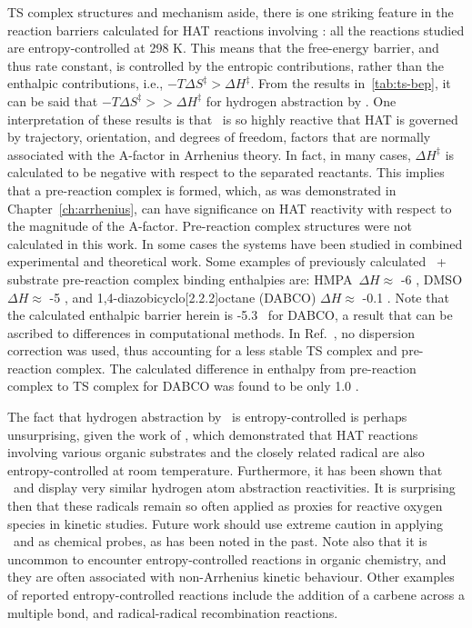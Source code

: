 \begin{doublespace}
TS complex structures and mechanism aside, there is one striking feature in the
reaction barriers calculated for HAT reactions involving \cumo: all the
reactions studied are entropy-controlled at 298 K. This means that the
free-energy barrier, and thus rate constant, is controlled by the entropic
contributions, rather than the enthalpic contributions, i.e., $-T\Delta
S^\ddagger > \Delta H^\ddagger$. From the results in~\ref{tab:ts-bep}, it can
be said that $-T\Delta S^\ddagger >> \Delta H^\ddagger$ for hydrogen
abstraction by \cumo. One interpretation of these results is that \cumo\ is so
highly reactive that HAT is governed by trajectory, orientation, and degrees of
freedom, factors that are normally associated with the A-factor in Arrhenius
theory. In fact, in many cases, $\Delta H^\ddagger$ is calculated to be
negative with respect to the separated reactants. This implies that a
pre-reaction complex is formed, which, as was demonstrated in
Chapter~\ref{ch:arrhenius}, can have significance on HAT reactivity with
respect to the magnitude of the A-factor. Pre-reaction complex structures were
not calculated in this work. In some cases the systems have been
studied in combined experimental and theoretical work. Some examples of
previously calculated \cumo\ + substrate pre-reaction complex binding
enthalpies are: HMPA\footnotemark\ $\Delta H \approx$ -6 \kcalmol, DMSO $\Delta
H \approx$ -5 \kcalmol, and 1,4-diazobicyclo[2.2.2]octane
(DABCO)\cite{Salamone2011b} $\Delta H \approx$ -0.1 \kcalmol. Note that the
calculated enthalpic barrier herein is -5.3 \kcalmol\ for DABCO, a result that
can be ascribed to differences in computational methods. In
Ref.~, no dispersion correction was used, thus
accounting for a less stable TS complex and pre-reaction complex. The
calculated difference in enthalpy from pre-reaction complex to TS complex for
DABCO was found to be only 1.0 \kcalmol.


The fact that hydrogen abstraction by \cumo\ is entropy-controlled is perhaps
unsurprising, given the work of \citet{Finn2004}, which demonstrated that HAT
reactions involving various organic substrates and the closely related radical
 are also entropy-controlled at room temperature. Furthermore, it
has been shown that \cumo\ and  display very similar hydrogen atom
abstraction reactivities.\cite{Salamone2011, Valgimigli1995, Sheeller2001,
Baignee1983} It is surprising then that these radicals remain so often applied
as proxies for reactive oxygen species in kinetic studies. Future work should
use extreme caution in applying \cumo\ and  as chemical probes, as
has been noted in the past.\cite{Finn2004, Salamone2011b, Salamone2011} Note
also that it is uncommon to encounter entropy-controlled reactions in organic
chemistry, and they are often associated with non-Arrhenius kinetic behaviour.
Other examples of reported entropy-controlled reactions include the addition of
a carbene across a multiple bond,\cite{Houk1984, Moss2017} and radical-radical
recombination reactions.\cite{Sobek2001}


\end{doublespace}
